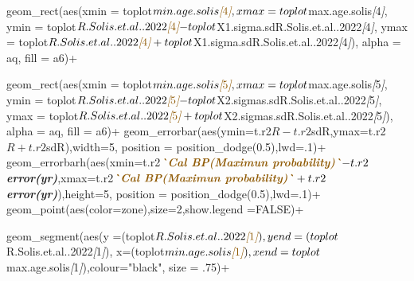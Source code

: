 \documentclass[
]{article}
\newenvironment{Shaded}{\begin{snugshade}}{\end{snugshade}}
\newcommand{\CommentTok}[1]{\textcolor[rgb]{0.56,0.35,0.01}{\textit{#1}}}
\newcommand{\InformationTok}[1]{\textcolor[rgb]{0.56,0.35,0.01}{\textbf{\textit{#1}}}}
\newcommand{\NormalTok}[1]{#1}
\newcommand{\OtherTok}[1]{\textcolor[rgb]{0.56,0.35,0.01}{#1}}
\begin{document}
\begin{Shaded}
\begin{Highlighting}[]
\NormalTok{  geom\_rect(aes(xmin = toplot$min.age.solis}\CommentTok{[}\OtherTok{4}\CommentTok{]}\NormalTok{, }
\NormalTok{              xmax = toplot$max.age.solis}\CommentTok{[}\OtherTok{4}\CommentTok{]}\NormalTok{, }
\NormalTok{              ymin = toplot$R.Solis.et.al..2022}\CommentTok{[}\OtherTok{4}\CommentTok{]}\NormalTok{{-}toplot$X1.sigma.sdR.Solis.et.al..2022}\CommentTok{[}\OtherTok{4}\CommentTok{]}\NormalTok{,}
\NormalTok{              ymax = toplot$R.Solis.et.al..2022}\CommentTok{[}\OtherTok{4}\CommentTok{]}\NormalTok{+toplot$X1.sigma.sdR.Solis.et.al..2022}\CommentTok{[}\OtherTok{4}\CommentTok{]}\NormalTok{),}
\NormalTok{          alpha = aq,}
\NormalTok{          fill = a6)+}

\NormalTok{  geom\_rect(aes(xmin = toplot$min.age.solis}\CommentTok{[}\OtherTok{5}\CommentTok{]}\NormalTok{, }
\NormalTok{                xmax = toplot$max.age.solis}\CommentTok{[}\OtherTok{5}\CommentTok{]}\NormalTok{, }
\NormalTok{                ymin = toplot$R.Solis.et.al..2022}\CommentTok{[}\OtherTok{5}\CommentTok{]}\NormalTok{{-}toplot$X2.sigmas.sdR.Solis.et.al..2022}\CommentTok{[}\OtherTok{5}\CommentTok{]}\NormalTok{,}
\NormalTok{                ymax = toplot$R.Solis.et.al..2022}\CommentTok{[}\OtherTok{5}\CommentTok{]}\NormalTok{+toplot$X2.sigmas.sdR.Solis.et.al..2022}\CommentTok{[}\OtherTok{5}\CommentTok{]}\NormalTok{),}
\NormalTok{            alpha = aq,}
\NormalTok{            fill = a6)+}
\NormalTok{  geom\_errorbar(aes(ymin=t.r2$R{-}t.r2$sdR,ymax=t.r2$R+t.r2$sdR),width=5,}
\NormalTok{                            position = position\_dodge(0.5),lwd=.1)+}
\NormalTok{  geom\_errorbarh(aes(xmin=t.r2$}\InformationTok{\textasciigrave{}Cal BP(Maximun probability)\textasciigrave{}}\NormalTok{{-}t.r2$}\InformationTok{\textasciigrave{}error(yr)\textasciigrave{}}\NormalTok{,xmax=t.r2$}\InformationTok{\textasciigrave{}Cal BP(Maximun probability)\textasciigrave{}}\NormalTok{+t.r2$}\InformationTok{\textasciigrave{}error(yr)\textasciigrave{}}\NormalTok{),height=5,}
\NormalTok{              position = position\_dodge(0.5),lwd=.1)+}
\NormalTok{              geom\_point(aes(color=zone),size=2,show.legend =FALSE)+}
  
\NormalTok{  geom\_segment(aes(y =(toplot$R.Solis.et.al..2022}\CommentTok{[}\OtherTok{1}\CommentTok{]}\NormalTok{),}
\NormalTok{                   yend =(toplot$R.Solis.et.al..2022}\CommentTok{[}\OtherTok{1}\CommentTok{]}\NormalTok{),}
\NormalTok{                   x=(toplot$min.age.solis}\CommentTok{[}\OtherTok{1}\CommentTok{]}\NormalTok{),}
\NormalTok{                   xend=toplot$max.age.solis}\CommentTok{[}\OtherTok{1}\CommentTok{]}\NormalTok{),colour="black", size = .75)+}
  

\end{Highlighting}
\end{Shaded}
\end{document}
